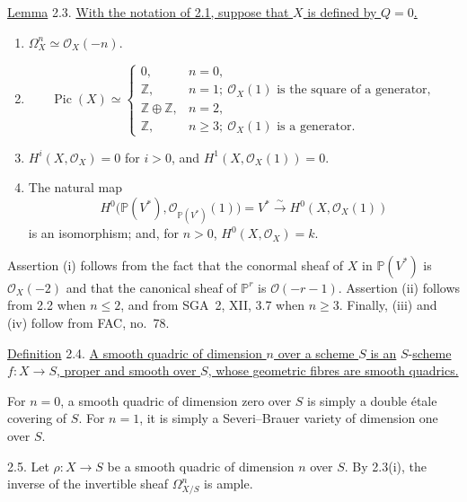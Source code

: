 
\underline{Lemma} 2.3. \underline{With the notation of 2.1, suppose that
$X$ is defined by $Q=0$.}

\begin{enumerate}[label=(\roman*),leftmargin=2.6em]
\item $\Omega_X^n\simeq\mathcal O_X(-n)$.

\item
\begin{equation*}
\operatorname{Pic}(X)\simeq
\begin{cases}
0, & n=0,\\
\mathbb Z, & n=1;\ \mathcal O_X(1)\text{ is the square of a generator},\\
\mathbb Z\oplus\mathbb Z, & n=2,\\
\mathbb Z, & n\geq 3;\ \mathcal O_X(1)\text{ is a generator}.
\end{cases}
\end{equation*}

\item $H^i(X,\mathcal O_X)=0$ for $i>0$, and
$H^1(X,\mathcal O_X(1))=0$.

\item The natural map
\begin{equation*}
H^0\bigl(\mathbb P(V^*),\mathcal O_{\mathbb P(V^*)}(1)\bigr)
=V^*\xrightarrow{\sim}H^0(X,\mathcal O_X(1))
\end{equation*}
is an isomorphism; and, for $n>0$,
$H^0(X,\mathcal O_X)=k$.
\end{enumerate}

Assertion (i) follows from the fact that the conormal sheaf of $X$ in
$\mathbb P(V^*)$ is $\mathcal O_X(-2)$ and that the canonical sheaf of
$\mathbb P^r$ is $\mathcal O(-r-1)$.  Assertion (ii) follows from 2.2
when $n\leq 2$, and from SGA~2, XII, 3.7 when $n\geq 3$.  Finally, (iii)
and (iv) follow from FAC, no.~78.

\underline{Definition} 2.4. \underline{A smooth quadric of dimension
$n$ over a scheme $S$ is an} $S$-\underline{scheme $f:X\longrightarrow S$, proper
and smooth over $S$, whose geometric fibres are smooth quadrics.}

For $n=0$, a smooth quadric of dimension zero over $S$ is simply a
double \'{e}tale covering of $S$.  For $n=1$, it is simply a
Severi--Brauer variety of dimension one over $S$.

2.5. Let $\rho:X\longrightarrow S$ be a smooth quadric of dimension $n$
over $S$.  By 2.3(i), the inverse of the invertible sheaf
$\Omega^n_{X/S}$ is ample.


